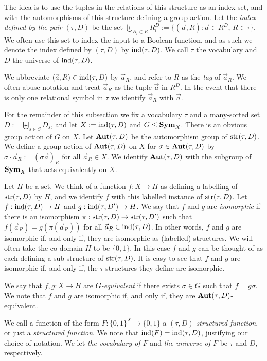 \documentclass[../main/thesis.tex]{subfiles}
\begin{document}
The idea is to use the tuples in the relations of this structure as an index
set, and with the automorphisms of this structure defining a group action. Let
the \emph{index defined by the pair $(\tau, D)$} be the set $\biguplus_{R_i\in
  R} R^{D}_i := \{ (\vec{a}, R) : \vec{a} \in R^{D}, \, R \in \tau \} $. We
often use this set to index the input to a Boolean function, and as such we
denote the index defined by $(\tau, D)$ by $\text{\upshape ind}(\tau, D)$. We call $\tau$ the
vocabulary and $D$ the universe of $\text{\upshape ind}(\tau, D)$.

We abbreviate $(\vec{a}, R) \in \text{\upshape ind}(\tau, D)$ by $\vec{a}_R$, and refer to $R$
as the \emph{tag} of $\vec{a}_R$. We often abuse notation and treat $\vec{a}_R$
as the tuple $\vec{a}$ in $R^D$. In the event that there is only one relational
symbol in $\tau$ we identify $\vec{a}_R$ with $\vec{a}$.

For the remainder of this subsection we fix a vocabulary $\tau$ and a
many-sorted set $D := \biguplus_{s \in S} D_{s}$, and let $X := \text{\upshape ind} (\tau, D)$
and $G \leq \text{\textbf{Sym}}_{X}$. There is an obvious group action of $G$ on $X$. Let $\text{\textbf{Aut}}
(\tau, D)$ be the automorphism group of $\text{str}(\tau, D)$. We define a group
action of $\text{\textbf{Aut}} (\tau, D)$ on $X$ for $\sigma \in \text{\textbf{Aut}}(\tau, D)$ by $\sigma
\cdot \vec{a}_R := (\sigma \vec{a})_R$ for all $\vec{a}_R \in X$. We identify
$\text{\textbf{Aut}}(\tau, D)$ with the subgroup of $\text{\textbf{Sym}}_X$ that acts equivalently on $X$.

Let $H$ be a set. We think of a function $f : X \rightarrow H$ as defining a
labelling of $\text{str}(\tau,D)$ by $H$, and we identify $f$ with this labelled
instance of $\text{str}(\tau, D)$. Let $f: \text{\upshape ind}(\tau, D) \rightarrow H$ and $g : \text{\upshape ind} (\tau,
D') \rightarrow H$. We say that $f$ and $g$ are \emph{isomorphic} if there is an
isomorphism $\pi : \text{str}(\tau, D) \rightarrow \text{str}(\tau, D')$ such that $f(\vec{a}_R) =
g(\pi(\vec{a}_R))$ for all $\vec{a}_R \in \text{\upshape ind}(\tau, D)$. In other words, $f$
and $g$ are isomorphic if, and only if, they are isomorphic as (labelled)
structures. We will often take the co-domain $H$ to be $\{0,1\}$. In this case
$f$ and $g$ can be thought of as each defining a sub-structure of
$\text{str}(\tau,D)$. It is easy to see that $f$ and $g$ are isomorphic if, and only
if, the $\tau$ structures they define are isomorphic.

We say that $f, g: X \rightarrow H$ are \emph{$G$-equivalent} if there exists
$\sigma \in G$ such that $f = g \sigma$. We note that $f$ and $g$ are isomorphic
if, and only if, they are $\text{\textbf{Aut}}(\tau, D)$-equivalent.

We call a function of the form $F:\{0,1\}^{X} \rightarrow \{0,1\}$ a
\emph{$(\tau, D)$-structured function}, or just a \emph{structured function}. We
note that $\text{\upshape ind}(F) = \text{\upshape ind}(\tau, D)$, justifying our choice of notation. We let
\emph{the vocabulary of $F$} and \emph{the universe of $F$} be $\tau$ and $D$,
respectively.
\end{document}
